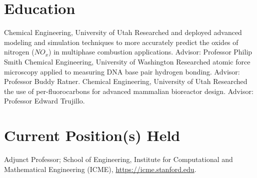 \documentclass[letterpaper]{twentysecondcv_spd} %
\begin{document}

\section{Education}

\begin{twenty} %
	 {\normalfont Chemical Engineering, University of Utah} {Researched and deployed advanced
modeling and simulation techniques to more accurately predict the oxides of nitrogen ($NO_x$) in multiphase combustion applications. Advisor: Professor Philip Smith}
	 {\normalfont Chemical Engineering, University of Washington} {Researched atomic force microscopy applied to
          measuring DNA base pair hydrogen bonding. Advisor: Professor Buddy Ratner.}
	 {\normalfont Chemical Engineering, University of Utah} {Researched the use of per-fluorocarbons for advanced mammalian bioreactor design. Advisor: Professor Edward Trujillo.}
\end{twenty}


\section{Current Position(s) Held}

\begin{twentyshort} %
  	 {Adjunct Professor; School of Engineering, Institute for Computational and Mathematical Engineering (ICME), \underline{https://icme.stanford.edu}.}
  \end{twentyshort}

\end{document}
